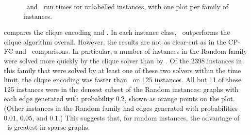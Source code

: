 \begin{figure}[htb]
{        \label{figure:mcsplain-runtime-mcsplitdown-kdown-bv}
    }
    \caption{\McSplitDown\ and \kDown\ run times for unlabelled instances, with one plot per family of instances.}
    \label{figure:mcsplain-runtime-mcsplitdown-kdown-scatters}
\end{figure}



\FloatBarrier

 compares the clique encoding and \McSplitDown.
In each instance class, \McSplitDown\ outperforms the clique algorithm overall.  However, the results are
not as clear-cut as in the CP-FC and \kDown\ comparisons.  In particular, a number of instances
in the Random family were solved more quickly by the clique solver than by \McSplitDown.  Of the 2398
instances in this family that were solved by at least one of these two solvers within the time limit,
the clique encoding was faster than \McSplitDown\ on 125 instances.  All but 11 of these 125 instances
were in the densest subset of the Random instances: graphs with each edge generated with probability $0.2$,
shown as orange points on the plot.
(Other instances in the Random family had edges generated with probabilities $0.01$, $0.05$, and $0.1$.)
This suggests that, for random instances, the advantage of \McSplitDown\ is greatest in sparse graphs.

